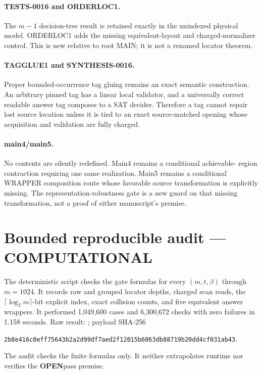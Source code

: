 \documentclass[11pt]{article}
\newcommand{\COMP}{\textbf{COMPUTATIONAL}}
\newcommand{\OPEN}{\textbf{OPEN}}
\begin{document}
\paragraph{TESTS-0016 and ORDERLOC1.}
The $m-1$ decision-tree result is retained exactly in the unindexed physical
model.  ORDERLOC1 adds the missing equivalent-layout and charged-normalizer
control.  This is new relative to root MAIN; it is not a renamed locator
theorem.

\paragraph{TAGGLUE1 and SYNTHESIS-0016.}
Proper bounded-occurrence tag gluing remains an exact semantic construction.
An arbitrary pinned tag has a linear local validator, and a universally
correct readable answer tag composes to a SAT decider.  Therefore a tag cannot
repair lost source location unless it is tied to an exact source-matched
opening whose acquisition and validation are fully charged.

\paragraph{main4/main5.}
No contents are silently redefined.  Main4 remains a conditional achievable-
region contraction requiring one same realization.  Main5 remains a
conditional WRAPPER composition route whose favorable source transformation
is explicitly missing.  The representation-robustness gate is a new guard on
that missing transformation, not a proof of either manuscript's premise.

\section{Bounded reproducible audit --- \COMP}

The deterministic script
checks the gate formulas for every $(m,t,\beta)$ through $m=1024$.  It records
raw and grouped locator depths, charged scan reads, the
$\lceil\log_2m\rceil$-bit explicit index, exact collision counts, and five
equivalent answer wrappers.  It performed 1,049,600 cases and 6,300,672 checks
with zero failures in 1.158 seconds.  Raw result:
;
payload SHA-256
\begin{center}
\texttt{2b8e416c0eff75643b2a2d99df7aed2f12015b6063db88719b20dd4cf031ab43}.
\end{center}
The audit checks the finite formulas only.  It neither extrapolates runtime
nor verifies the \OPEN pass premise.
\end{document}
